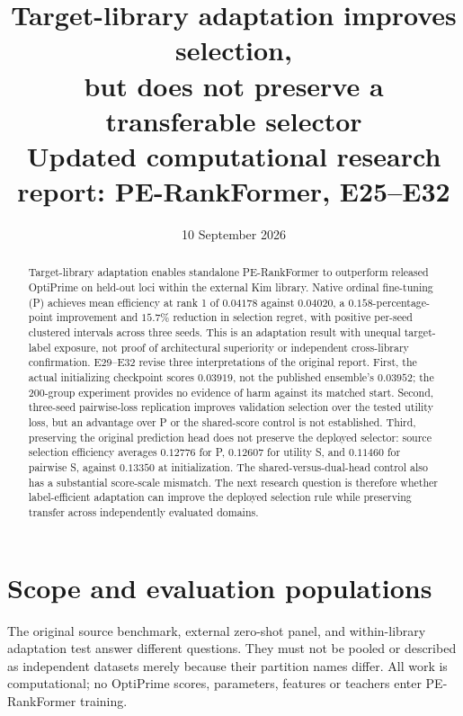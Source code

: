 \documentclass[11pt]{article}
\title{\textbf{Target-library adaptation improves selection,\\but does not preserve a transferable selector}\\[0.35em]
\large Updated computational research report: PE-RankFormer, E25--E32}
\author{}
\date{10 September 2026}
\begin{document}
\maketitle
\begin{abstract}
\noindent
Target-library adaptation enables standalone PE-RankFormer to outperform released
OptiPrime on held-out loci within the external Kim library. Native ordinal fine-tuning
(P) achieves mean efficiency at rank 1 of $0.04178$ against $0.04020$, a
$0.158$-percentage-point improvement and $15.7\%$ reduction in selection regret, with
positive per-seed clustered intervals across three seeds. This is an adaptation result
with unequal target-label exposure, not proof of architectural superiority or independent
cross-library confirmation. E29--E32 revise three interpretations of the original report.
First, the actual initializing checkpoint scores $0.03919$, not the published ensemble's
$0.03952$; the 200-group experiment provides no evidence of harm against its matched start.
Second, three-seed pairwise-loss replication improves validation selection over the tested
utility loss, but an advantage over P or the shared-score control is not established.
Third, preserving the original prediction head does not preserve the deployed selector:
source selection efficiency averages $0.12776$ for P, $0.12607$ for utility S, and $0.11460$
for pairwise S, against $0.13350$ at initialization. The shared-versus-dual-head control also
has a substantial score-scale mismatch. The next research question is therefore whether
label-efficient adaptation can improve the deployed selection rule while preserving
transfer across independently evaluated domains.
\end{abstract}
\tableofcontents
\bigskip

\section{Scope and evaluation populations}
The original source benchmark, external zero-shot panel, and within-library adaptation
test answer different questions. They must not be pooled or described as independent
datasets merely because their partition names differ. All work is computational; no
OptiPrime scores, parameters, features or teachers enter PE-RankFormer training.
\end{document}
